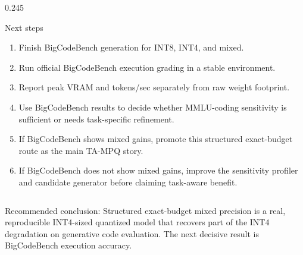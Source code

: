 \documentclass[final]{beamer}
\begin{document}
\begin{frame}[t]
\begin{columns}[t,totalwidth=\textwidth]
\begin{column}{0.245\textwidth}
    \begin{block}{Next steps}
      \begin{enumerate}
        \item Finish BigCodeBench generation for INT8, INT4, and mixed.
        \item Run official BigCodeBench execution grading in a stable environment.
        \item Report peak VRAM and tokens/sec separately from raw weight footprint.
        \item Use BigCodeBench results to decide whether MMLU-coding sensitivity is sufficient or needs task-specific refinement.
        \item If BigCodeBench shows mixed gains, promote this structured exact-budget route as the main TA-MPQ story.
        \item If BigCodeBench does not show mixed gains, improve the sensitivity profiler and candidate generator before claiming task-aware benefit.
      \end{enumerate}
    \end{block}
  \end{column}
\end{columns}

\vfill
\begin{center}
{\color{Muted}\large
Recommended conclusion: Structured exact-budget mixed precision is a real, reproducible INT4-sized quantized model that recovers part of the INT4 degradation on generative code evaluation. The next decisive result is BigCodeBench execution accuracy.}
\end{center}

\end{frame}
\end{document}
